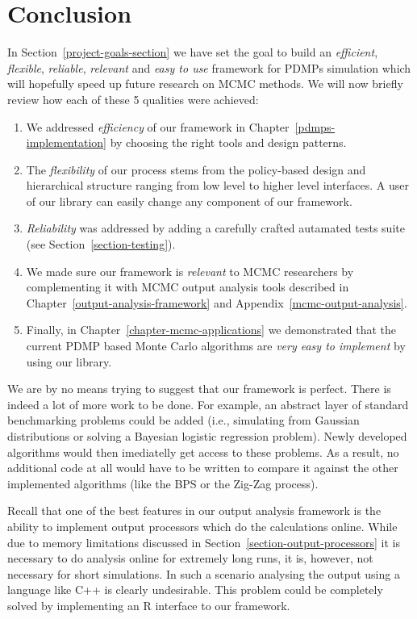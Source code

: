 \documentclass[report.tex]{subfiles}
\begin{document}
\chapter{Conclusion}

In Section~\ref{project-goals-section} we have set the goal to build an
\textit{efficient}, \textit{flexible},
\textit{reliable}, \textit{relevant} and \textit{easy to use}
framework for PDMPs simulation which will hopefully speed up future research
on MCMC methods. We will now briefly review how each of these 5 qualities were
achieved:
\begin{enumerate}
  \item We addressed \textit{efficiency} of our framework in Chapter~\ref{pdmps-implementation}
    by choosing the right tools and design patterns.
  \item The \textit{flexibility} of our process stems from the policy-based design and
    hierarchical structure ranging from low level to higher level interfaces.
    A user of our library can easily change any component of our framework.
  \item \textit{Reliability} was addressed by adding a carefully crafted autamated
    tests suite (see Section~\ref{section-testing}).
  \item We made sure our framework is \textit{relevant} to MCMC researchers
    by complementing it with MCMC
    output analysis tools described in Chapter~\ref{output-analysis-framework} and
    Appendix~\ref{mcmc-output-analysis}.
  \item Finally, in Chapter~\ref{chapter-mcmc-applications} we demonstrated that
    the current PDMP based Monte Carlo algorithms are \textit{very easy to implement}
    by using our library.
\end{enumerate}

\noindent
We are by no means trying to suggest that our framework is perfect.
There is indeed a lot of more work to be done.
For example, an abstract layer of standard benchmarking problems could be
added (i.e., simulating from Gaussian distributions or solving a Bayesian
logistic regression problem).
Newly developed algorithms would then imediatelly get access to these
problems.
As a result, no additional code at all would
have to be written to compare it against the other implemented algorithms
(like the BPS or the Zig-Zag process).

Recall that one of the best features in our output analysis framework
is the ability to implement output processors which do the calculations online.
While due to memory limitations discussed in Section~\ref{section-output-processors}
it is necessary to do analysis online for extremely long runs, it is, however,
not necessary for short simulations.
In such a scenario analysing the output using a language like C++ is clearly
undesirable.
This problem could be completely solved by implementing an R interface to our
framework.
\end{document}
